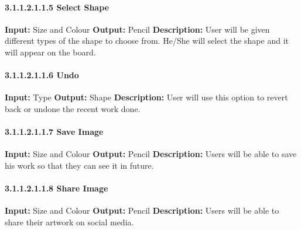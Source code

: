 \documentclass{scrreprt}
\begin{document}
\paragraph{3.1.1.2.1.1.5 Select Shape}
\hfill \vspace{2.5mm} \break 
\textbf{Input:} Size and Colour \newline
\textbf{Output:} Pencil
\vspace{1mm}\newline
\textbf{Description:} \newline 
User will be given different types of the shape to choose from. He/She will select the shape and it will appear on the board.

\paragraph{3.1.1.2.1.1.6 Undo}
\hfill \vspace{2.5mm} \break 
\textbf{Input:} Type \newline
\textbf{Output:} Shape
\vspace{1mm}\newline
\textbf{Description:} \newline 
User will use this option to revert back or undone the recent work done.

\paragraph{3.1.1.2.1.1.7 Save Image}
\hfill \vspace{2.5mm} \break 
\textbf{Input:} Size and Colour \newline
\textbf{Output:} Pencil
\vspace{1mm}\newline
\textbf{Description:} \newline 
Users will be able to save his work so that they can see it in future.

\paragraph{3.1.1.2.1.1.8 Share Image}
\hfill \vspace{2.5mm} \break 
\textbf{Input:} Size and Colour \newline
\textbf{Output:} Pencil
\vspace{1mm}\newline
\textbf{Description:} \newline
Users will be able to share their artwork on social media.
\end{document}
